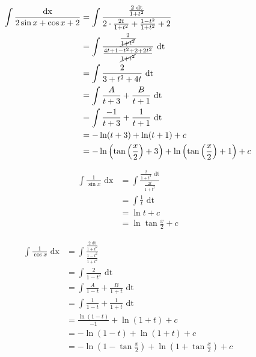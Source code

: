 \documentclass[a4paper,12pt]{article}
\newcommand{\?}{\stackrel{?}{=}}
\begin{document}
\begin{definition}
\begin{my_example}
\begin{align*}
  \int \frac{\text{dx}}{2\sin x + \cos x + 2} &= \int \frac{\frac{2\text{ dt}}{1+t^2}}{2 \cdot \frac{2t}{1+t^2} + \frac{1-t^2}{1+t^2} + 2}\\
  &= \int \frac{\frac{2}{\cancel{1+t^2}}}{\frac{4t+1-t^2+2+2t^2}{\cancel{1+t^2}}} \text{ dt}\\
  &= \int \frac{2}{3+t^2+4t} \text{ dt}\\
  &= \int \frac{A}{t+3} + \frac{B}{t+1} \text{ dt}\\
  &= \int \frac{-1}{t+3} + \frac{1}{t+1} \text{ dt}\\
  &= -\ln(t+3) + \ln(t+1) + c\\
  &= -\ln\left(\tan\left(\frac{x}{2}\right)+3\right) + \ln\left(\tan\left(\frac{x}{2}\right)+1\right) + c\\
\end{align*}
\end{my_example}

\begin{my_example}
\begin{align*}
  \int \frac{1}{\sin x} \text{ dx} &= \int \frac{\frac{2}{1+t^2} \text{ dt}}{\frac{2t}{1+t^2}}\\
  &= \int \frac{1}{t} \text{ dt}\\
  &= \ln{t} + c\\
  &= \ln{\tan \frac{x}{2}} + c
\end{align*}
\end{my_example}

\begin{my_example}
\begin{align*}
  \int \frac{1}{\cos x} \text{ dx} &= \int \frac{\frac{2 \text{ dt}}{1+t^2}}{\frac{1-t^2}{1+t^2}}\\
  &= \int \frac{2}{1-t^2} \text{ dt}\\
  &= \int \frac{A}{1-t} + \frac{B}{1+t} \text{ dt}\\
  &= \int \frac{1}{1-t} + \frac{1}{1+t} \text{ dt}\\
  &= \frac{\ln(1-t)}{-1} + \ln(1+t) + c\\
  &= -\ln(1-t) + \ln(1+t) + c\\
  &= -\ln\left(1-\tan\frac{x}{2}\right) + \ln\left(1+\tan\frac{x}{2}\right) + c\\
\end{align*}
\end{my_example}


\end{definition}
\end{document}
